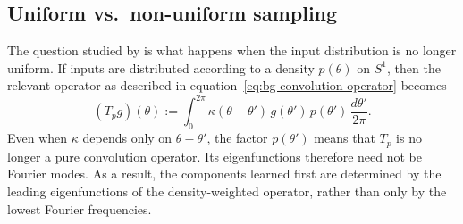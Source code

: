 \subsection{Uniform vs.\ non-uniform sampling}\label{subsec:uniform-nonuniform}

The question studied by \citet{basri2020frequencybiasneuralnetworks} is what
happens when the input distribution is no longer uniform. If inputs are
distributed according to a density \(p(\theta)\) on \(S^1\), then the relevant
operator as described in equation~\eqref{eq:bg-convolution-operator} becomes
\[
	(T_{p}g)(\theta)
	:=
	\int_0^{2\pi}
	\kappa(\theta-\theta')\,g(\theta')\,p(\theta')
	\,\frac{d\theta'}{2\pi}.
\]
Even when \(\kappa\) depends only on \(\theta-\theta'\), the factor
\(p(\theta')\) means that \(T_p\) is no longer a pure convolution operator. Its
eigenfunctions therefore need not be Fourier modes. As a result, the components
learned first are determined by the leading eigenfunctions of the
density-weighted operator, rather than only by the lowest Fourier frequencies.

